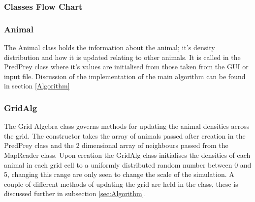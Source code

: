 \documentclass[11pt]{report}
\begin{document}
\subsubsection{Classes Flow Chart}

\subsubsection{Animal}
\label{sec:Animal}
The Animal class holds the information about the animal; it's density distribution and how it is updated relating to other animals.
It is called in the PredPrey class where it's values are initialised from those taken from the GUI or input file. Discussion of the implementation of the main algorithm can be found in section \ref{Algorithm}
\subsubsection{GridAlg}
\label{sec:GridAlg}
The Grid Algebra class governs methods for updating the animal densities across the grid. The constructor takes the array of animals passed after creation in the PredPrey class and the 2 dimensional array of neighbours passed from the MapReader class. Upon creation the GridAlg class initialises the densities of each animal in each grid cell to a uniformly distributed random number between 0 and 5, changing this range are only seen to change the scale of the simulation. A couple of different methods of updating the grid are held in the class, these is discussed further in subsection \ref{sec:Algorithm}.
\end{document}
